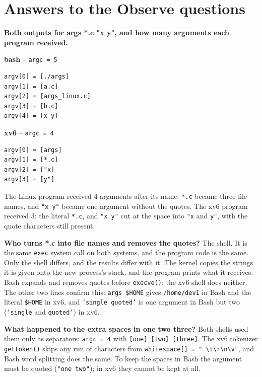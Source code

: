 \documentclass{assets/utmreport}
\begin{document}
\section{Answers to the Observe questions}
\begin{utmenumerate}
\item \textbf{Both outputs for args *.c "x y", and how many arguments each program received.}

\begin{minipage}[t]{0.47\linewidth}\textbf{bash} -- \texttt{argc = 5}
\begin{verbatim}
argv[0] = [./args]
argv[1] = [a.c]
argv[2] = [args_linux.c]
argv[3] = [b.c]
argv[4] = [x y]
\end{verbatim}\end{minipage}\hfill
\begin{minipage}[t]{0.47\linewidth}\textbf{xv6} -- \texttt{argc = 4}
\begin{verbatim}
argv[0] = [args]
argv[1] = [*.c]
argv[2] = ["x]
argv[3] = [y"]
\end{verbatim}\end{minipage}

The Linux program received 4 arguments after its name: \texttt{*.c} became three file names, and \texttt{"x y"} became one argument without the quotes. The xv6 program received 3: the literal \texttt{*.c}, and \texttt{"x y"} cut at the space into \texttt{"x} and \texttt{y"}, with the quote characters still present.
\item \textbf{Who turns *.c into file names and removes the quotes?} The shell. It is the same \texttt{exec} system call on both systems, and the program code is the same. Only the shell differs, and the results differ with it. The kernel copies the strings it is given onto the new process's stack, and the program prints what it receives. Bash expands and removes quotes before \texttt{execve()}; the xv6 shell does neither. The other two lines confirm this: \texttt{args \$HOME} gives \texttt{/home/dev1} in Bash and the literal \texttt{\$HOME} in xv6, and \texttt{'single quoted'} is one argument in Bash but two (\texttt{'single} and \texttt{quoted'}) in xv6.
\item \textbf{What happened to the extra spaces in one two three?} Both shells used them only as separators: \texttt{argc = 4} with \texttt{[one] [two] [three]}. The xv6 tokenizer \texttt{gettoken()} skips any run of characters from \texttt{whitespace[] = " \textbackslash t\textbackslash r\textbackslash n\textbackslash v"}, and Bash word splitting does the same. To keep the spaces in Bash the argument must be quoted (\texttt{"one   two"}); in xv6 they cannot be kept at all.
\end{utmenumerate}
\end{document}
